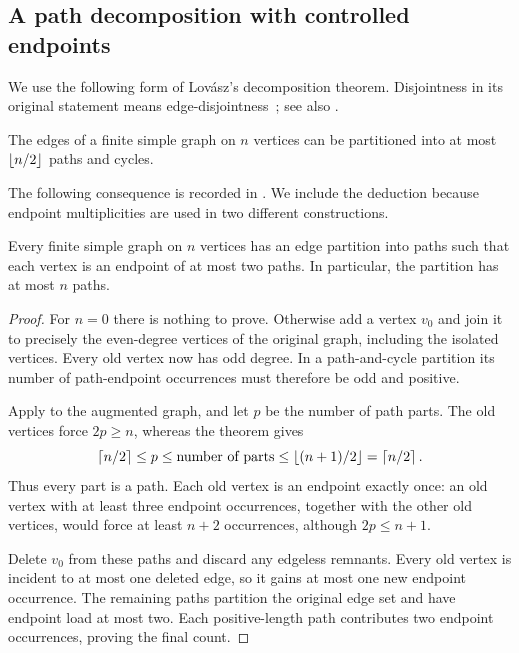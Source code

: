 \subsection{A path decomposition with controlled endpoints}

We use the following form of Lov\'asz's decomposition theorem.
Disjointness in its original statement means
edge-disjointness~\cite[Theorem~1]{Lovasz1968}; see also
\cite[Theorem~21]{BM2024}.

\begin{theorem}\label{thm:lovasz}
The edges of a finite simple graph on \(n\) vertices can be
partitioned into at most \(\left\lfloor n/2\right\rfloor\) paths and cycles.
\end{theorem}

The following consequence is recorded in
\cite[Corollary~22]{BM2024}. We include the deduction because
endpoint multiplicities are used in two different constructions.

\begin{corollary}\label{cor:endpoint-paths}
Every finite simple graph on \(n\) vertices has an edge
partition into paths such that each vertex is an endpoint of at
most two paths. In particular, the partition has at most \(n\)
paths.
\end{corollary}

\begin{proof}
For \(n=0\) there is nothing to prove. Otherwise add a vertex
\(v_0\) and join it to precisely the even-degree vertices of
the original graph, including the isolated vertices. Every old
vertex now has odd degree. In a path-and-cycle partition its
number of path-endpoint occurrences must therefore be odd and
positive.

Apply  to the augmented graph, and let \(p\)
be the number of path parts. The old vertices force \(2p\ge n\),
whereas the theorem gives
\[
 \left\lceil n/2\right\rceil\le p
 \le \text{number of parts}
 \le \left\lfloor(n+1)/2\right\rfloor=\left\lceil n/2\right\rceil.
\]
Thus every part is a path. Each old vertex is an endpoint
exactly once: an old vertex with at least three endpoint
occurrences, together with the other old vertices, would force
at least \(n+2\) occurrences, although \(2p\le n+1\).

Delete \(v_0\) from these paths and discard any edgeless
remnants. Every old vertex is incident to at most one deleted
edge, so it gains at most one new endpoint occurrence. The
remaining paths partition the original edge set and have
endpoint load at most two. Each positive-length path contributes
two endpoint occurrences, proving the final count.
\end{proof}

